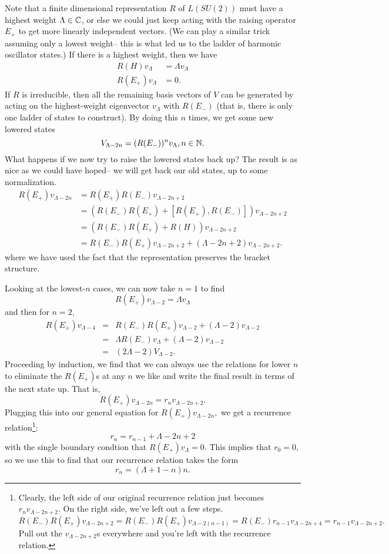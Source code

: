 Note that a finite dimensional representation $R$ of $L(SU(2))$ must have a highest weight $\Lambda \in \mathbb{C}$, or else we could just keep acting with the raising operator $E_+$ to get more linearly independent vectors. (We can play a similar trick assuming only a lowest weight-- this is what led us to the ladder of harmonic oscillator states.)
If there is a highest weight, then we have
\begin{align*}
    R(H)v_\Lambda &= \Lambda v_\Lambda\\
    R(E_+)v_\Lambda &= 0.
\end{align*}
If $R$ is irreducible, then all the remaining basis vectors of $V$ can be generated by acting on the highest-weight eigenvector $v_\Lambda$ with $R(E_-)$ (that is, there is only one ladder of states to construct). By doing this $n$ times, we get some new lowered states
$$V_{\Lambda-2n}=(R(E_-))^n v_\Lambda, n\in \mathbb{N}.$$
What happens if we now try to raise the lowered states back up? The result is as nice as we could have hoped-- we will get back our old states, up to some normalization.
\begin{align*}
    R(E_+)v_{\Lambda-2n} &= R(E_+) R(E_-)v_{\Lambda-2n+2}\\
    &= (R(E_-)R(E_+)+[R(E_+),R(E_-)]) v_{\Lambda -2n + 2}\\
    &= (R(E_-)R(E_+)+R(H)) v_{\Lambda -2n + 2}\\
    &= R(E_-)R(E_+)v_{\Lambda -2n+2} + (\Lambda -2n+2) v_{\Lambda-2n+2}.
\end{align*}
where we have used the fact that the representation preserves the bracket structure.

Looking at the lowest-$n$ cases, we can now take $n=1$ to find
$$R(E_+)v_{\Lambda-2}=\Lambda v_\Lambda$$
and then for $n=2$,
\begin{eqnarray*}
R(E_+)v_{\Lambda-4}&=&R(E_-)R(E_+)v_{\Lambda-2}+(\Lambda-2)v_{\Lambda-2}\\
&=&\Lambda R(E_-)v_\Lambda +(\Lambda-2)v_{\Lambda-2}\\
&=&(2\Lambda-2) V_{\Lambda-2}.
\end{eqnarray*}
Proceeding by induction, we find that we can always use the relations for lower $n$ to eliminate the $R(E_+)$s at any $n$ we like and write the final result in terms of the next state up. That is,
$$R(E_+)v_{\Lambda -2n}= r_n v_{\Lambda-2n+2}.$$
Plugging this into our general equation for $R(E_+)v_{\Lambda-2n},$ we get a recurrence relation\footnote{Clearly, the left side of our original recurrence relation just becomes $r_n v_{\Lambda-2n+2}$. On the right side, we've left out a few steps. $R(E_-)R(E_+)v_{\Lambda-2n+2}=R(E_-)R(E_+)v_{\Lambda-2(n-1)}=R(E_-)r_{n-1}v_{\Lambda -2n+4} = r_{n-1}v_{\Lambda-2n+2}.$ Pull out the $v_{\Lambda-2n+2}$s everywhere and you're left with the recurrence relation.}:
$$r_n = r_{n-1}+\Lambda -2n+2$$
with the single boundary condtion that $R(E_+)v_\Lambda =0$. This implies that $r_0=0,$ so we use this to find that our recurrence relation takes the form
$$r_n=(\Lambda+1-n)n.$$

